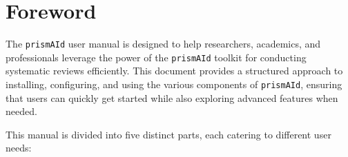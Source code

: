 \chapter*[Foreword]{Foreword}

The \texttt{prismAId} user manual is designed to help researchers, academics, and professionals leverage the power of the \texttt{prismAId} toolkit for conducting systematic reviews efficiently. This document provides a structured approach to installing, configuring, and using the various components of \texttt{prismAId}, ensuring that users can quickly get started while also exploring advanced features when needed.

This manual is divided into five distinct parts, each catering to different user needs:

